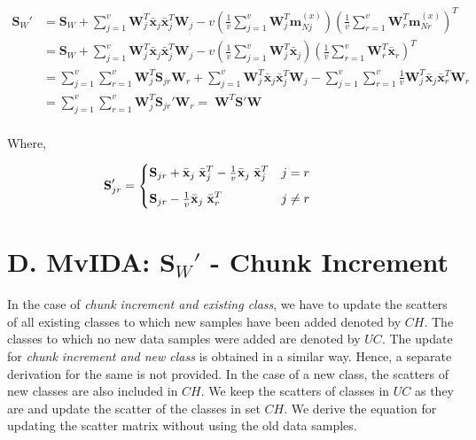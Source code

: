 \begin{equation*}
\begin{split}
\textbf{S}_W' & = \textbf{S}_W + \sum_{j=1}^{v} \textbf{W}_j^T \bar{\textbf{x}}_j \bar{\textbf{x}}_j^T \textbf{W}_j - v \left ( \frac{1}{v} \sum_{j=1}^{v} \textbf{W}_j^T \textbf{m}_{Nj}^{(x)} \right ) \left ( \frac{1}{v} \sum_{r=1}^{v} \textbf{W}_r^T {\textbf{m}_{Nr}^{(x)}} \right )^T
\\
& = \textbf{S}_W + \sum_{j=1}^{v} \textbf{W}_j^T \bar{\textbf{x}}_j \bar{\textbf{x}}_j^T \textbf{W}_j - v \left ( \frac{1}{v} \sum_{j=1}^{v} \textbf{W}_j^T \bar{\textbf{x}}_j \right ) \left ( \frac{1}{v} \sum_{r=1}^{v} \textbf{W}_r^T \bar{\textbf{x}}_r \right )^T
\\
& = \sum_{j=1}^{v} \sum_{r=1}^{v} \textbf{W}_j^T \textbf{S}_{jr} \textbf{W}_r + \sum_{j=1}^{v} \textbf{W}_j^T \bar{\textbf{x}}_j \bar{\textbf{x}}_j^T \textbf{W}_j - \sum_{j=1}^{v} \sum_{r=1}^{v} \frac{1}{v} \textbf{W}_j^T \bar{\textbf{x}}_j \bar{\textbf{x}}_r^T \textbf{W}_r
\\
& = \sum_{j=1}^{v} \sum_{r=1}^{v} \textbf{W}_j^T \textbf{S}_{jr}' \textbf{W}_r = \; \textbf{W}^T \textbf{S}' \textbf{W} \\
\end{split}
\end{equation*}
\normalsize

\noindent
Where,

\small
\begin{equation*}
\begin{split}
\textbf{S}_{jr}' = \left\{\begin{matrix*}[l]
\textbf{S}_{jr} + \bar{\textbf{x}}_{j} \; \bar{\textbf{x}}_{j}^T - \frac{1}{v} \bar{\textbf{x}}_j \; \bar{\textbf{x}}_j^T & j=r
\\[0.3cm]
\textbf{S}_{jr} - \frac{1}{v} \bar{\textbf{x}}_j \; \bar{\textbf{x}}_r^T & j \neq r
\end{matrix*}\right. \hspace{1.3cm}
\end{split}
\end{equation*}
\normalsize









\section*{D. MvIDA: $\textbf{S}_W'$ - Chunk Increment}
\label{proof:MvIDA_ChunkEx}
In the case of \textit{chunk increment and existing class}, we have to update the scatters of all existing classes to which new samples have been added denoted by $CH$. The classes to which no new data samples were added are denoted by $UC$. The update for \textit{chunk increment and new class} is obtained in a similar way. Hence, a separate derivation for the same is not provided. In the case of a new class, the scatters of new classes are also included in $CH$. We keep the scatters of classes in $UC$ as they are and update the scatter of the classes in set $CH$. We derive the equation for updating the scatter matrix without using the old data samples.

